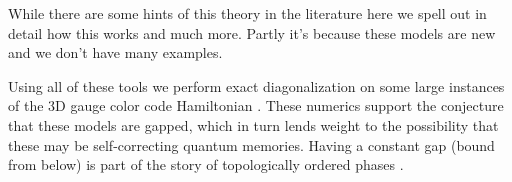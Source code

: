 \documentclass[11pt,oneside]{article}
\newcommand{\SRef}[1]{section~\ref{#1}}
\begin{document}
While there are
some hints of this theory in the literature 
\cite{Bacon2006quantum,Yoshida2010} %
here we spell out in detail how this works and much more.
Partly it's because these models are new and we don't have
many examples.

Using all of these tools we 
perform exact diagonalization on some 
large instances of the 3D gauge color code 
Hamiltonian \cite{Bombin2015,Bombin2015single,Kubica2015}.
These numerics support the conjecture that these models are gapped,
which in turn lends weight to the possibility that these may
be self-correcting quantum memories.
Having a constant gap (bound from below)
is part of the story of topologically ordered phases
\cite{Kitaev2003,Brown2016}.




\end{document}
